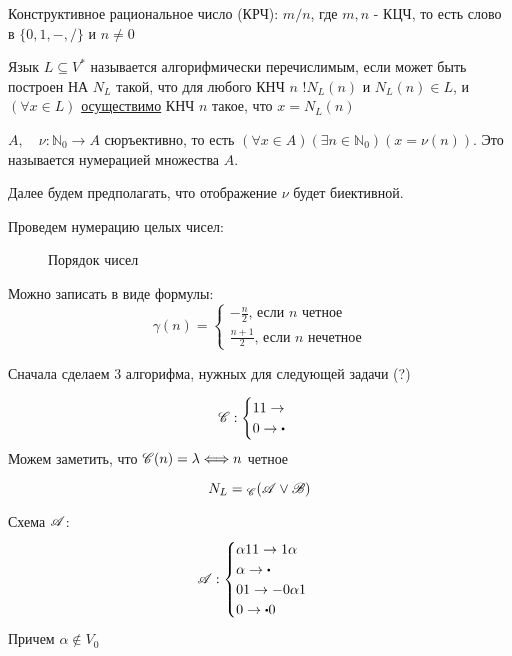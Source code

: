 \begin{definition}
Конструктивное рациональное число (КРЧ): $m / n$, где $m,n$ - КЦЧ, то есть слово в
 $\{0, 1, -, /\} $ и $n \neq 0$
\end{definition}

\begin{definition}
Язык $L \subseteq V^{*}$ называется алгорифмически перечислимым, если может быть построен НА 
$N_L$ такой, что для любого КНЧ  $n$ $!N_L(n)$ и $N_L(n) \in L$, и $(\forall x \in L)$
\underline{осуществимо} КНЧ $n$ такое, что  $x = N_L(n)$
\end{definition}

\medskip

\begin{definition}
$A, \quad \nu: \mathbb{N}_0 \to A$ сюръективно, то есть\newline
$(\forall x \in A)(\exists n \in \mathbb{N}_0)(x = \nu(n))$.
Это называется нумерацией множества $A$.
\end{definition}

Далее будем предполагать, что отображение $\nu$ будет биективной.

\medskip

Проведем нумерацию целых чисел:

\begin{figure}[h]
    \centering
    \caption{Порядок чисел}
    \label{fig:}
\end{figure}

Можно записать в виде формулы:
\[
\gamma(n) = \begin{cases}
    -\frac{n}{2}\text{, если $n$ четное}\\
    \frac{n+1}{2}\text{, если $n$ нечетное}
\end{cases}
\] 

\medskip

Сначала сделаем 3 алгорифма, нужных для следующей задачи (?)

\[
\scr{C}: \begin{cases}
    11 \to \\
    0 \to \bigcdot
\end{cases}
\] 
Можем заметить, что $\mathscr{C}(n) = \lambda \Longleftrightarrow n$ четное

\[
    N_L = {}_{\mathscr{C}}(\mathscr{A} \lor \mathscr{B})
\]

Схема $\mathscr{A}$:
 \[
\scr{A}: \begin{cases}
    \alpha 11 \to 1\alpha\\
    \alpha \to \bigcdot\\
    01 \to -0\alpha 1\\
    0 \to \bigcdot 0\\
\end{cases}
\]
Причем $\alpha \not\in V_0$

